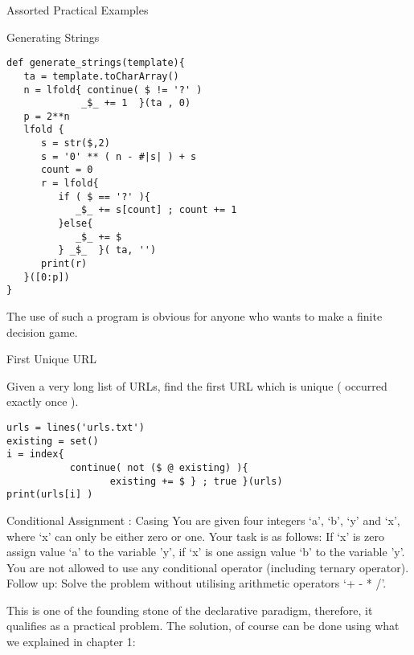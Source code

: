 \begin{section}{Assorted Practical Examples}
\begin{subsection}{Generating Strings}
\begin{center}\begin{minipage}{\linewidth}
\begin{lstlisting}[style=JexlStyle]
def generate_strings(template){
   ta = template.toCharArray()
   n = lfold{ continue( $ != '?' )
             _$_ += 1  }(ta , 0)
   p = 2**n 
   lfold {
      s = str($,2)
      s = '0' ** ( n - #|s| ) + s 
      count = 0 
      r = lfold{ 
         if ( $ == '?' ){
            _$_ += s[count] ; count += 1  
         }else{
            _$_ += $
         } _$_  }( ta, '')
      print(r)     
   }([0:p])      
}
\end{lstlisting}  
\end{minipage}\end{center}

The use of such a program is obvious for anyone who wants to make
a finite decision game.
\end{subsection}

\begin{subsection}{First Unique URL}

Given a very long list of URLs, find the first URL which is unique ( occurred exactly once ). 
\begin{center}\begin{minipage}{\linewidth}
\begin{lstlisting}[style=JexlStyle]
urls = lines('urls.txt')
existing = set()
i = index{ 
           continue( not ($ @ existing) ){ 
                  existing += $ } ; true }(urls)
print(urls[i] )
\end{lstlisting}  
\end{minipage}\end{center}

\end{subsection}

\begin{subsection}{Conditional Assignment : Casing }
You are given four integers `a', `b', `y' and `x', 
where `x' can only be either zero or one. 
Your task is as follows: 
If `x' is zero assign value `a' to the variable 'y', if `x' is one assign value `b' to the variable 'y'. 
You are not allowed to use any conditional operator (including ternary operator). 
Follow up: Solve the problem without utilising arithmetic operators `+ - * /'.

This is one of the founding stone of the declarative paradigm, therefore, it qualifies
as a practical problem. The solution, of course can be done using what we explained in chapter 1:


\end{subsection}
\end{section}
